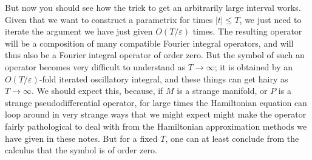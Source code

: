 \documentclass{article}
\theoremstyle{plain}
\theoremstyle{remark}
\theoremstyle{definition}
\begin{document}
But now you should see how the trick to get an arbitrarily large interval works. Given that we want to construct a parametrix for times $|t| \leq T$, we just need to iterate the argument we have just given $O(T / \varepsilon)$ times. The resulting operator will be a composition of many compatible Fourier integral operators, and will thus also be a Fourier integral operator of order zero. But the symbol of such an operator becomes very difficult to understand as $T \to \infty$; it is obtained by an $O(T / \varepsilon)$-fold iterated oscillatory integral, and these things can get hairy as $T \to \infty$. We should expect this, because, if $M$ is a strange manifold, or $P$ is a strange pseudodifferential operator, for large times the Hamiltonian equation can loop around in very strange ways that we might expect might make the operator fairly pathological to deal with from the Hamiltonian approximation methods we have given in these notes. But for a fixed $T$, one can at least conclude from the calculus that the symbol is of order zero.





%
%
\end{document}
